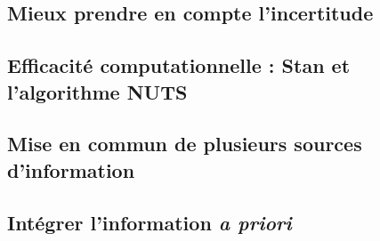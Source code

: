 
\subsection{Mieux prendre en compte l'incertitude}

\subsection{Efficacité computationnelle : Stan et l'algorithme NUTS}

\subsection{Mise en commun de plusieurs sources d'information}

\subsection{Intégrer l'information {\em a priori}}



